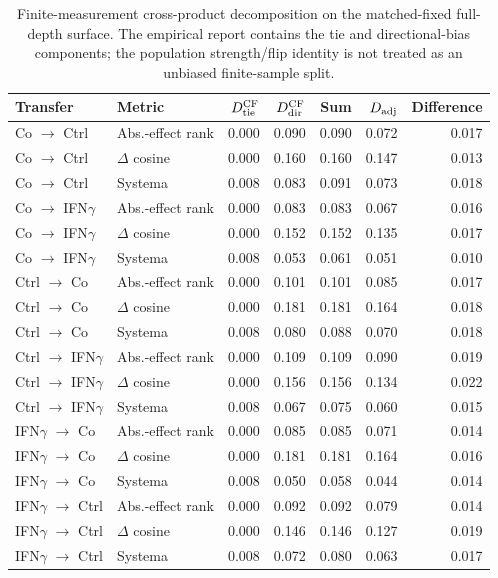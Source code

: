 \begin{table}[H]
\centering
\scriptsize
\caption{Finite-measurement cross-product decomposition on the matched-fixed full-depth surface. The empirical report contains the tie and directional-bias components; the population strength/flip identity is not treated as an unbiased finite-sample split.}
\label{tab:transport-decomposition}
\begin{tabular}{llrrrrr}
\toprule
Transfer & Metric & $D_{\rm tie}^{\rm CF}$ & $D_{\rm dir}^{\rm CF}$ & Sum & $D_{\rm adj}$ & Difference \\
\midrule
Co $\to$ Ctrl & Abs.-effect rank & 0.000 & 0.090 & 0.090 & 0.072 & 0.017 \\
Co $\to$ Ctrl & $\Delta$ cosine & 0.000 & 0.160 & 0.160 & 0.147 & 0.013 \\
Co $\to$ Ctrl & Systema & 0.008 & 0.083 & 0.091 & 0.073 & 0.018 \\
Co $\to$ IFN$\gamma$ & Abs.-effect rank & 0.000 & 0.083 & 0.083 & 0.067 & 0.016 \\
Co $\to$ IFN$\gamma$ & $\Delta$ cosine & 0.000 & 0.152 & 0.152 & 0.135 & 0.017 \\
Co $\to$ IFN$\gamma$ & Systema & 0.008 & 0.053 & 0.061 & 0.051 & 0.010 \\
Ctrl $\to$ Co & Abs.-effect rank & 0.000 & 0.101 & 0.101 & 0.085 & 0.017 \\
Ctrl $\to$ Co & $\Delta$ cosine & 0.000 & 0.181 & 0.181 & 0.164 & 0.018 \\
Ctrl $\to$ Co & Systema & 0.008 & 0.080 & 0.088 & 0.070 & 0.018 \\
Ctrl $\to$ IFN$\gamma$ & Abs.-effect rank & 0.000 & 0.109 & 0.109 & 0.090 & 0.019 \\
Ctrl $\to$ IFN$\gamma$ & $\Delta$ cosine & 0.000 & 0.156 & 0.156 & 0.134 & 0.022 \\
Ctrl $\to$ IFN$\gamma$ & Systema & 0.008 & 0.067 & 0.075 & 0.060 & 0.015 \\
IFN$\gamma$ $\to$ Co & Abs.-effect rank & 0.000 & 0.085 & 0.085 & 0.071 & 0.014 \\
IFN$\gamma$ $\to$ Co & $\Delta$ cosine & 0.000 & 0.181 & 0.181 & 0.164 & 0.016 \\
IFN$\gamma$ $\to$ Co & Systema & 0.008 & 0.050 & 0.058 & 0.044 & 0.014 \\
IFN$\gamma$ $\to$ Ctrl & Abs.-effect rank & 0.000 & 0.092 & 0.092 & 0.079 & 0.014 \\
IFN$\gamma$ $\to$ Ctrl & $\Delta$ cosine & 0.000 & 0.146 & 0.146 & 0.127 & 0.019 \\
IFN$\gamma$ $\to$ Ctrl & Systema & 0.008 & 0.072 & 0.080 & 0.063 & 0.017 \\
\bottomrule
\end{tabular}
\end{table}

